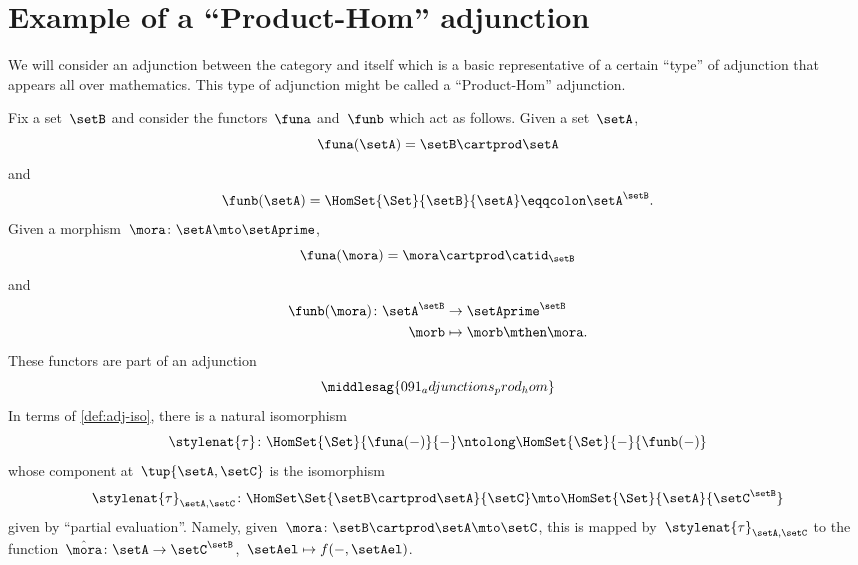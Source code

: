 
\section[Product-Hom adjunction]{Example of a ``Product-Hom'' adjunction}
We will consider an adjunction between the category \Set and itself which is a basic representative of a certain ``type'' of adjunction that appears all over mathematics.
This type of adjunction might be called a ``Product-Hom'' adjunction.

Fix a set~$\setB$ and consider the functors~$\funa$ and~$\funb$ which act as follows.
Given a set~$\setA$,
\begin{equation*}
    \funa(\setA) = \setB \cartprod \setA
\end{equation*}
and
\begin{equation*}
    \funb(\setA) = \HomSet{\Set}{\setB}{\setA} \eqqcolon \setA^\setB.
\end{equation*}
Given a morphism~$\mora\colon \setA \mto \setAprime$,
\begin{equation*}
    \funa(\mora) = \mora \cartprod \catid_\setB
\end{equation*}
and
\begin{equation*}
    \begin{aligned}
        \funb(\mora)\colon \setA^\setB & \to \setAprime^\setB        \\
        \morb                          & \mapsto \morb \mthen \mora.
    \end{aligned}
\end{equation*}
% 
These functors are part of an adjunction
% 
\begin{equation}
    \middlesag{091_adjunctions_prod_hom}
\end{equation}
In terms of \cref{def:adj-iso}, there is a natural isomorphism
\begin{equation*}
    \stylenat{\tau}\colon \HomSet{\Set}{\funa(- )}{-}  \ntolong   \HomSet{\Set}{-}{\funb( - )}
\end{equation*}
whose component at~$\tup{\setA,\setC}$ is the isomorphism
\begin{equation*}
    \stylenat{\tau}_{\setA,\setC} \colon \HomSet\Set{\setB\cartprod \setA}{\setC} \mto \HomSet{\Set}{\setA}{\setC^\setB}
\end{equation*}
given by ``partial evaluation''.
Namely, given~$\mora \colon \setB \cartprod \setA \mto \setC$, this is mapped by~$\stylenat{\tau}_{\setA,\setC}$ to the function~$\hat \mora \colon \setA \to \setC^\setB$,~$\setAel \mapsto f( -, \setAel)$.

